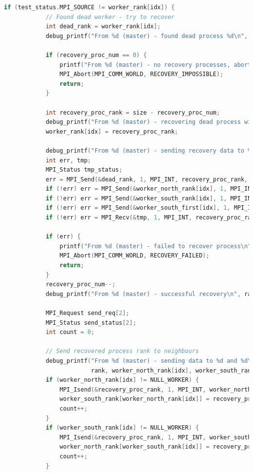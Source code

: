 \documentclass[a4paper]{article}
\begin{document}
\begin{lstlisting}[caption=jac\_3d\_mpi\_ft.c, label={lst:2}, language=C]
        if (test_status.MPI_SOURCE != worker_rank[idx]) {
            // Found dead worker - try to recover
            int dead_rank = worker_rank[idx];
            debug_printf("From %d (master) - found dead process %d\n", rank, dead_rank);

            if (recovery_proc_num == 0) {
                printf("From %d (master) - no recovery processes, abort", rank);
                MPI_Abort(MPI_COMM_WORLD, RECOVERY_IMPOSSIBLE);
                return;
            }

            int recovery_proc_rank = size - recovery_proc_num;
            debug_printf("From %d (master) - recovering dead process with %d\n", rank, recovery_proc_rank);
            worker_rank[idx] = recovery_proc_rank;

            debug_printf("From %d (master) - sending recovery data to %d\n", rank, recovery_proc_rank);
            int err, tmp;
            MPI_Status tmp_status;
            err = MPI_Send(&dead_rank, 1, MPI_INT, recovery_proc_rank, RECOVERY_REQ_TAG, MPI_COMM_WORLD);
            if (!err) err = MPI_Send(&worker_north_rank[idx], 1, MPI_INT, recovery_proc_rank, RECOVERY_REQ_TAG, MPI_COMM_WORLD);
            if (!err) err = MPI_Send(&worker_south_rank[idx], 1, MPI_INT, recovery_proc_rank, RECOVERY_REQ_TAG, MPI_COMM_WORLD);
            if (!err) err = MPI_Send(&worker_south_first[idx], 1, MPI_INT, recovery_proc_rank, RECOVERY_REQ_TAG, MPI_COMM_WORLD);
            if (!err) err = MPI_Recv(&tmp, 1, MPI_INT, recovery_proc_rank, RECOVERY_REQ_TAG, MPI_COMM_WORLD, &tmp_status);

            if (err) {
                printf("From %d (master) - failed to recover process\n", rank);
                MPI_Abort(MPI_COMM_WORLD, RECOVERY_FAILED);
                return;
            }
            recovery_proc_num--;
            debug_printf("From %d (master) - successful recovery\n", rank);

            MPI_Request send_req[2];
            MPI_Status send_status[2];
            int count = 0;

            // Send recovered process rank to neighbours
            debug_printf("From %d (master) - sending data to %d and %d\n",
                         rank, worker_north_rank[idx], worker_south_rank[idx]);
            if (worker_north_rank[idx] != NULL_WORKER) {
                MPI_Isend(&recovery_proc_rank, 1, MPI_INT, worker_north_rank[idx], RECOVERY_REQ_TAG, MPI_COMM_WORLD, &send_req[count]);
                worker_south_rank[worker_north_rank[idx]] = recovery_proc_rank;
                count++;
            }
            if (worker_south_rank[idx] != NULL_WORKER) {
                MPI_Isend(&recovery_proc_rank, 1, MPI_INT, worker_south_rank[idx], RECOVERY_REQ_TAG, MPI_COMM_WORLD, &send_req[count]);
                worker_north_rank[worker_south_rank[idx]] = recovery_proc_rank;
                count++;
            }


\end{lstlisting}
\end{document}
